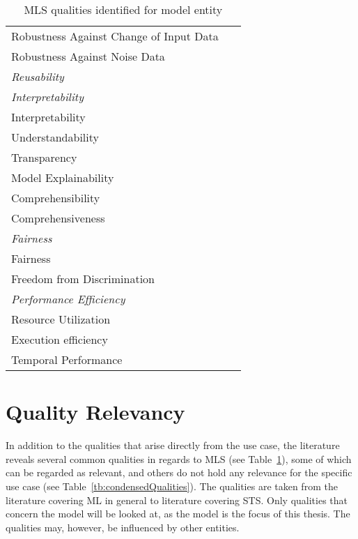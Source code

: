 \begin{table}[h]
\begin{tabular}{p{} p{}}
        Robustness Against Change of Input Data &~\cite{nakamichi_requirements-driven_2020} \\
        Robustness Against Noise Data &~\cite{nakamichi_requirements-driven_2020} \\
        \midrule
        \textit{Reusability} &~\cite{ashmore_assuring_2021} \\
        \midrule
        \textit{Interpretability} \\
        Interpretability &~\cite{ashmore_assuring_2021, siebert_construction_2021, zhang_machine_2020}\\
        Understandability &~\cite{nakamichi_requirements-driven_2020} \\
        Transparency &~\cite{arpteg_software_2018} \\
        Model Explainability &~\cite{vogelsang_requirements_2019} \\
        Comprehensibility &~\cite{ashmore_assuring_2021} \\
        Comprehensiveness &~\cite{ashmore_assuring_2021} \\
        \midrule
        \textit{Fairness}\\
        Fairness &~\cite{siebert_construction_2021, zhang_machine_2020} \\
        Freedom from Discrimination &~\cite{vogelsang_requirements_2019} \\
        \midrule
        \textit{Performance Efficiency} \\
        Resource Utilization &~\cite{siebert_construction_2021,
                                nakamichi_requirements-driven_2020} \\
        Execution efficiency &~\cite{siebert_construction_2021} \\
        Temporal Performance &~\cite{nakamichi_requirements-driven_2020} \\
        \bottomrule
    \end{tabular}
    \caption{MLS qualities identified for model entity\label{tb:LiteratureQualitiesModel}}
\end{table}
\FloatBarrier%

\section{Quality Relevancy}\label{se:relevant-qualities}
In addition to the qualities that arise directly from the use case, the literature reveals several
common qualities in regards to \ac{MLS} (see Table~\ref{tb:LiteratureQualitiesModel}), some of which
can be regarded as relevant, and others do not hold any relevance for the specific use case (see
Table~\ref{tb:condensedQualities}).
The qualities are taken from the literature covering \ac{ML} in general to literature
covering \ac{STS}.
Only qualities that concern the model will be looked at, as the model is the focus of this thesis.
The qualities may, however, be influenced by other entities.

